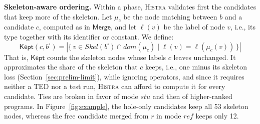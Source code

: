 \documentclass[10pt,conference]{IEEEtran}
\begin{document}
\textbf{Skeleton-aware ordering.} Within a phase, \textsc{Histra} validates first the candidates that keep more of the skeleton. Let $\mu_c$ be the node matching between $b$ and a candidate $c$, computed as in $\mathsf{Merge}$, and let $\ell(v)$ be the label of node $v$, i.e., its type together with its identifier or constant. We define:
\[ \mathsf{Kept}(c, b^{\square}) = |\{\, v \in \mathit{Skel}(b^{\square}) \cap \mathit{dom}(\mu_c) \mid \ell(v) = \ell(\mu_c(v)) \,\}| \]
That is, $\mathsf{Kept}$ counts the skeleton nodes whose labels $c$ leaves unchanged. It approximates the share of the skeleton that $c$ keeps, i.e., one minus its skeleton loss (Section~\ref{sec:prelim-limit}), while ignoring operators, and since it requires neither a TED nor a test run, \textsc{Histra} can afford to compute it for every candidate. Ties are broken in favor of mode $\mathit{stu}$ and then of higher-ranked programs. In Figure~\ref{fig:example}, the hole-only candidates keep all 53 skeleton nodes, whereas the free candidate merged from $r$ in mode $\mathit{ref}$ keeps only 12.
\end{document}
